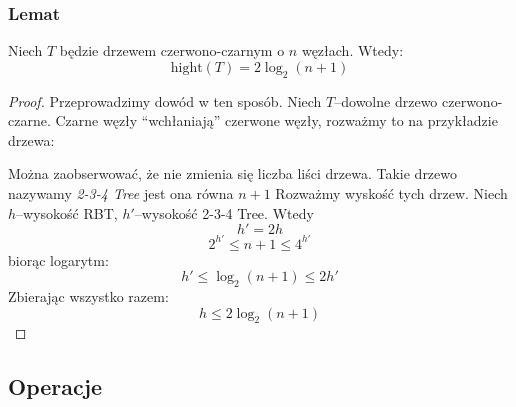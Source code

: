 \documentclass[11pt,a4paper]{article}
\begin{document}
\subsubsection*{Lemat}
Niech $T$ będzie drzewem czerwono-czarnym o $n$ węzłach. Wtedy:
\[
    \text{hight}(T) = 2\log_2(n+1)
\]
\begin{proof}
    Przeprowadzimy dowód w ten sposób. Niech $T$--dowolne drzewo czerwono-czarne. Czarne węzły ``wchłaniają'' czerwone węzły, rozważmy to na przykładzie drzewa:
    \begin{center}
\end{center}

    Można zaobserwować, że nie zmienia się liczba liści drzewa. Takie drzewo nazywamy \textit{2-3-4 Tree} jest ona równa $n+1$
    Rozważmy wyskość tych drzew. Niech $h$--wysokość RBT, $h'$--wysokość 2-3-4 Tree. Wtedy
    \[
        h'=2h
    \]
    \[
        2^{h'} \leq n+1 \leq 4^{h'}
    \]
    biorąc logarytm:
    \[
        h' \leq \log_2(n+1) \leq 2h'
    \]
    Zbierając wszystko razem:
    \[
        h\leq 2\log_2(n+1)
    \]
\end{proof}
\subsection{Operacje}
\end{document}
